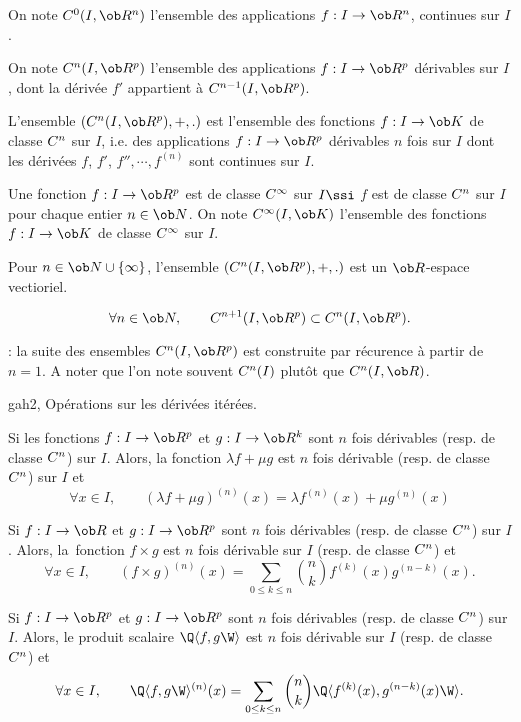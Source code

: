 On note $\sc C^0(I,\ob R^n)$ l'ensemble des applications $f:I\to\ob R^n$, continues sur $I$. 

On note $\sc C^n(I,\ob R^p)$ l'ensemble des applications $f:I\to\ob R^p$ 
d\'erivables sur $I$, dont la d\'eriv\'ee $f'$ appartient \`a $\sc C^{n-1}(I,\ob R^p)$. 


L'ensemble $(\sc C^n(I,\ob R^p), +, .)$ est l'ensemble des fonctions $f:I\to\ob K$ de classe $\sc C^n$ sur $I$, i.e. des applications $f:I\to\ob R^p$ d\'erivables $n$ fois sur $I$ dont les d\'eriv\'ees $f$, $f'$, $f'', \cdots, f^{(n)}$ sont continues sur $I$. 

Une fonction $f:I\to\ob R^p$ est de classe $\sc C^\infty$ sur $I\ssi$ $f$ est de classe $\sc C^n$ sur $I$ pour chaque entier $n\in\ob N$. \pn
On note $\sc C^\infty(I,\ob K)$ l'ensemble des fonctions $f:I\to\ob K$ de classe $\sc C^\infty$ sur $I$. 

\Propriete Pour $n\in\ob N\cup\{\infty\}$, l'ensemble $(\sc C^n(I,\ob R^p), +, .)$ est un $\ob R$-espace vectioriel. 

\Propriete
$$
\forall n\in\ob N, \qquad \sc C^{n+1}(I,\ob R^p)\subset\sc C^n(I,\ob R^p).
$$ 

\Remarque : la suite des ensembles $\sc C^n(I,\ob R^p)$ est construite par r\'ecurence \`a partir de $n=1$. A noter que l'on note souvent $\sc C^n(I)$ plut\^ot que $\sc C^n(I,\ob R)$. 
\bigskip


\Subsection gah2, Op\'erations sur les d\'eriv\'ees it\'er\'ees. 

Si les fonctions $f:I\to\ob R^p$ et $g:I\to\ob R^k$ sont $n$ fois d\'erivables (resp. de classe $\sc C^n$) sur $I$. 
Alors, la fonction $\lambda f+\mu g$ est $n$ fois d\'erivable (resp. de classe $\sc C^n$) sur $I$ et 
$$
\forall x\in I, \qquad (\lambda f+\mu g)^{(n)}(x)=\lambda f^{(n)}(x)+\mu g^{(n)}(x)
$$

\Theoreme [Title=Formule de Leibniz;$I$ intervalle, $n\in\ob N$]
Si $f:I\to\ob R$ et $g:I\to\ob R^p$ sont $n$ fois d\'erivables (resp. de classe $\sc C^n$) sur $I$. 
Alors, la~fonction $f\times g$ est $n$ fois d\'erivable sur $I$ (resp. de classe $\sc C^n$) et 
$$
\forall x\in I, \qquad (f\times g)^{(n)}(x)=\sum_{0\le k\le n}{n\choose k}f^{(k)}(x)g^{(n-k)}(x).
$$


Si $f:I\to\ob R^p$ et $g:I\to\ob R^p$ sont $n$ fois d\'erivables (resp. de classe $\sc C^n$) sur $I$. 
Alors, le produit scalaire $\Q\langle f,g\W\rangle$ est $n$ fois d\'erivable sur $I$ (resp. de classe $\sc C^n$) et 
$$
\forall x\in I, \qquad \Q\langle f,g\W\rangle^{(n)}(x)=\sum_{0\le k\le n}{n\choose k}\Q\langle f^{(k)}(x),g^{(n-k)}(x)\W\rangle.
$$

